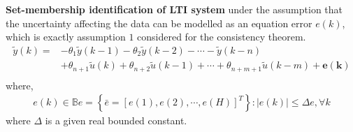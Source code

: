 \textbf{Set-membership identification of LTI system} under the assumption that the uncertainty affecting the data can be modelled as an equation error \(e(k)\), which is exactly assumption \(1\) considered for the consistency theorem.\\
\[
\begin{aligned}
\tilde{y}(k) = & -\theta_1 \tilde{y}(k - 1) - \theta_2 \tilde{y}(k - 2) - \cdots - \tilde{y}(k - n) \\[1ex]
               & + \theta_{n+1} \tilde{u}(k) + \theta_{n+2} \tilde{u}(k - 1) + \cdots + \theta_{n+m+1} \tilde{u}(k - m) + \mathbf{e(k)} \\[2ex]
\end{aligned}
\]
where,
\[
\begin{aligned}
e(k) \in \mathbb{B}e = \left\{ \bar{e} = [e(1), e(2), \cdots, e(H)]^T \right\} : \left| e(k) \right| \leq \Delta e, \forall k
\end{aligned}
\]
where  \(\Delta\) is a given real bounded constant.
